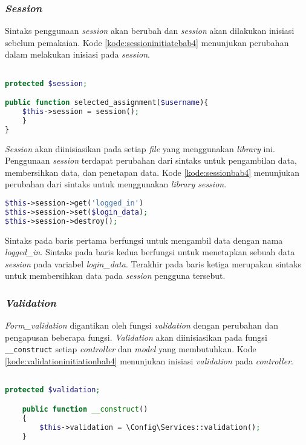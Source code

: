 \subsubsection{\textit{Session}}
Sintaks penggunaan \textit{session} akan berubah dan \textit{session} akan dilakukan inisiasi sebelum pemakaian. Kode \ref{kode:sessioninitiatebab4} menunjukan perubahan dalam melakukan inisiasi pada \textit{session}.
\begin{lstlisting}[language=PHP, caption=Perancangan inisiasi \textit{library session}, label=kode:sessioninitiatebab4]

protected $session;

public function selected_assignment($username){
	$this->session = session();
	}
}
\end{lstlisting}
\textit{Session} akan diinisiasikan pada setiap \textit{file} yang menggunakan \textit{library} ini. Penggunaan \textit{session} terdapat perubahan dari sintaks untuk pengambilan data, membersihkan data, dan penetapan data. Kode \ref{kode:sessionbab4} menunjukan perubahan dari sintaks untuk menggunakan \textit{library session}.
\begin{lstlisting}[language=PHP, caption=Perancangan penggunaan \textit{library session}, label=kode:sessionbab4]
$this->session->get('logged_in')
$this->session->set($login_data);
$this->session->destroy();
\end{lstlisting}
Sintaks pada baris pertama berfungsi untuk mengambil data dengan nama \textit{logged\_in}. Sintaks pada baris kedua berfungsi untuk menetapkan sebuah data \textit{session} pada variabel \textit{login\_data}. Terakhir pada baris ketiga merupakan sintaks untuk membersihkan data pada \textit{session} pengguna tersebut.

\subsubsection{\textit{Validation}}
\textit{Form\_validation} digantikan oleh fungsi \textit{validation} dengan perubahan dan pengapusan beberapa fungsi. \textit{Validation} akan diinisiasikan pada fungsi \texttt{\_\_construct} setiap \textit{controller} dan \textit{model} yang membutuhkan. Kode \ref{kode:validationinitiationbab4} menunjukan inisiasi \textit{validation} pada \textit{controller}.

\begin{lstlisting}[language=PHP, caption=Perancangan inisiasi \textit{validation} pada \texttt{\_\_construct}, label=kode:validationinitiationbab4]

protected $validation;

	public function __construct()
	{
		$this->validation = \Config\Services::validation();
	}
\end{lstlisting}

